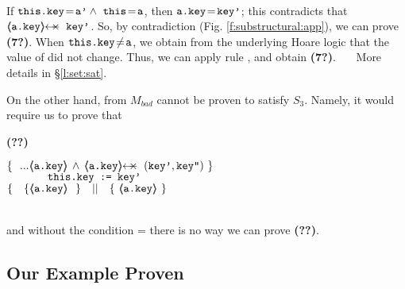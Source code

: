 \begin{example}
{{\begin{minipage}{.95\textwidth}
\begin{flushleft}
\end{flushleft}
\end{minipage}
}}
\\
 \vspace{.03cm}
\noindent
If  $ \prg{this.key}\!=\!\prg{a'} \wedge\ \prg{this}\!=\!\prg{a}$, then $\mbox{\normalfont{\texttt{a.key}}}\!=\!\mbox{\normalfont{\texttt{key'}}}$; this  contradicts that $\protectedFrom {\prg{a.key}} {\prg{key'}}$. So,  by contradiction (\cf Fig. \ref{f:substructural:app}), we can prove    \textbf{(7?)}.
When  $\mbox{\normalfont{\texttt{this.key}}}\!\neq \!\mbox{\normalfont{\texttt{a}}}$, we  obtain from the underlying Hoare logic that the value of  did not change. Thus, we can apply rule {}, and obtain  \textbf{(7?)}. \ \ \ More details in \S \ref{l:set:sat}.
 
 \vspace{.045cm}
\noindent
On the other hand,  from $M_{bad}$ cannot be proven to satisfy $S_3$. Namely, it %
would require  us to prove that\\
\vspace{.03cm}
{\small{  \begin{minipage}{.05\textwidth}
   \textbf{(??)}\ \ 
\end{minipage}
\hfill
\begin{minipage}{.95\textwidth}
\begin{flushleft}
$\{ \  \   ...    {\inside{\prg{a.key}}} \, \wedge \, \protectedFrom {\prg{a.key}} {(\prg{key'},\prg{key''})}  \   \} \ $\\
$\ \ \ \ \ \ \ \ \ \ \  \mbox{\normalfont{\texttt{this.key := key'}}}\   $\\
$  \{\  \ \   \{ {\inside{\prg{a.key}}}\   \   \} \ \ \  || \ \ \   \{ \ {\inside{\prg{a.key}}} \ \}  $ 
\end{flushleft}
\end{minipage}
}}
\\
and without the condition = there is no way we can prove \textbf{(??)}.

\subsection{Our Example Proven} %
\label{sect:example:proof:short}

\end{example}

 
